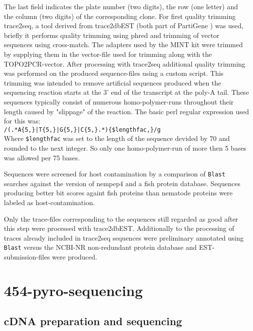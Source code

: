 The last field indicates the plate number (two digits), the row (one
letter) and the column (two digits) of the corresponding clone. For
first quality trimming trace2seq, a tool derived from trace2dbEST
(both part of PartiGene \cite{parkinson_partigene--constructing_2004})
was used, briefly it performs quality trimming using
phred\cite{ewing_base-calling_1998} and trimming of vector sequences
using cross-match\cite{PHRAP}. The adapters used by the MINT kit were
trimmed by supplying them in the vector-file used for trimming along
with the TOPO2PCR-vector. After processing with trace2seq additional
quality trimming was performed on the produced sequence-files using a
custom script. This trimming was intended to remove artificial
sequences produced when the sequencing reaction starts at the 3' end
of the transcript at the poly-A tail. These sequences typically
consist of numerous homo-polymer-runs throughout their length caused
by "slippage" of the reaction.
The basic perl regular expression used for this was:\\

\texttt{/(.*A\{5,\}|T\{5,\}|G\{5,\}|C\{5,\}.*)\{\$lengthfac,\}/g}\\

Where \texttt{\$lengthfac} was set to the length of the sequence
devided by 70 and rounded to the next integer. So only one
homo-polymer-run of more then 5 bases was allowed per 75 bases.

Sequences were screened for host contamination by a comparison of
\texttt{Blast} searches against the version of nempep4 and a fish
protein database. Sequences producing better bit scores againt fish
proteins than nematode proteins were labeled as host-contamination.

Only the trace-files corresponding to the sequences still regarded as
good after this step were processed with trace2dbEST. Additionally to
the processing of traces already included in trace2seq sequences were
preliminary annotated using \texttt{Blast} versus the NCBI-NR
non-redundant protein database and EST-submission-files were produced.

\section{454-pyro-sequencing}

\subsection{cDNA preparation and sequencing}

